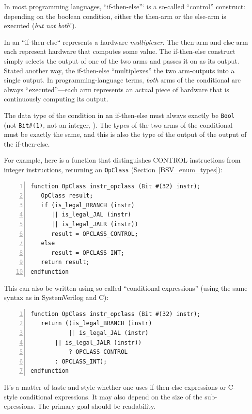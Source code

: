 
In most programming languages, ``if-then-else''` is a so-called
``control'' construct: depending on the boolean condition, either the
then-arm or the else-arm is executed (\emph{but not both}!).

In {\BSV} an ``if-then-else`` represents a hardware \emph{multiplexer}.
The then-arm and else-arm each represent hardware that computes some
value.  The if-then-else construct simply selects the output of one of
the two arms and passes it on as its output.  Stated another way, the
if-then-else ``multiplexes'' the two arm-outputs into a single output.
In programming-language terms, \emph{both} arms of the conditional are
always ``executed''---each arm represents an actual piece of hardware
that is continuously computing its output.

The data type of the condition in an if-then-else must always exactly
be \verb|Bool| (not \verb|Bit#(1)|, not an integer, {\etc}).  The
types of the two arms of the conditional must be exactly the same, and
this is also the type of the output of the output of the if-then-else.

For example, here is a function that distinguishes CONTROL
instructions from integer instructions, returning an \verb|OpClass|
(Section~\ref{BSV_enum_types}):

{\footnotesize
\begin{Verbatim}[frame=single, numbers=left]
function OpClass instr_opclass (Bit #(32) instr);
   OpClass result;
   if (is_legal_BRANCH (instr)
      || is_legal_JAL (instr)
      || is_legal_JALR (instr))
      result = OPCLASS_CONTROL;
   else
      result = OPCLASS_INT;
   return result;
endfunction
\end{Verbatim}
}

This can also be written using so-called ``conditional expressions''
(using the same syntax as in SystemVerilog and C):

{\footnotesize
\begin{Verbatim}[frame=single, numbers=left]
function OpClass instr_opclass (Bit #(32) instr);
   return ((is_legal_BRANCH (instr)
           || is_legal_JAL (instr)
	   || is_legal_JALR (instr))
           ? OPCLASS_CONTROL
	   : OPCLASS_INT);
endfunction
\end{Verbatim}
}

It's a matter of taste and style whether one uses if-then-else
expressions or C-style conditional expressions.  It may also depend on
the size of the sub-epressions.  The primary goal should be
readability.

